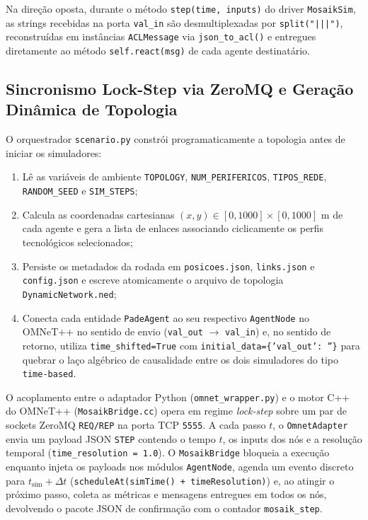 \documentclass[10pt,twocolumn,a4paper]{article}
\begin{document}
Na direção oposta, durante o método \texttt{step(time, inputs)} do driver \texttt{MosaikSim}, as strings recebidas na porta \texttt{val\_in} são desmultiplexadas por \texttt{split("|||")}, reconstruídas em instâncias \texttt{ACLMessage} via \texttt{json\_to\_acl()} e entregues diretamente ao método \texttt{self.react(msg)} de cada agente destinatário.

\subsection{Sincronismo Lock-Step via ZeroMQ e Geração Dinâmica de Topologia}

O orquestrador \texttt{scenario.py} constrói programaticamente a topologia antes de iniciar os simuladores:
\begin{enumerate}
    \item Lê as variáveis de ambiente \texttt{TOPOLOGY}, \texttt{NUM\_PERIFERICOS}, \texttt{TIPOS\_REDE}, \texttt{RANDOM\_SEED} e \texttt{SIM\_STEPS};
    \item Calcula as coordenadas cartesianas $(x, y) \in [0, 1000]\times[0, 1000]\text{ m}$ de cada agente e gera a lista de enlaces associando ciclicamente os perfis tecnológicos selecionados;
    \item Persiste os metadados da rodada em \texttt{posicoes.json}, \texttt{links.json} e \texttt{config.json} e escreve atomicamente o arquivo de topologia \texttt{DynamicNetwork.ned};
    \item Conecta cada entidade \texttt{PadeAgent} ao seu respectivo \texttt{AgentNode} no OMNeT++ no sentido de envio (\texttt{val\_out} $\to$ \texttt{val\_in}) e, no sentido de retorno, utiliza \texttt{time\_shifted=True} com \texttt{initial\_data=\{'val\_out': ''\}} para quebrar o laço algébrico de causalidade entre os dois simuladores do tipo \texttt{time-based}.
\end{enumerate}

O acoplamento entre o adaptador Python (\texttt{omnet\_wrapper.py}) e o motor C++ do OMNeT++ (\texttt{MosaikBridge.cc}) opera em regime \textit{lock-step} sobre um par de sockets ZeroMQ \texttt{REQ/REP} na porta TCP \texttt{5555}. A cada passo $t$, o \texttt{OmnetAdapter} envia um payload JSON \texttt{STEP} contendo o tempo $t$, os inputs dos nós e a resolução temporal (\texttt{time\_resolution = 1.0}). O \texttt{MosaikBridge} bloqueia a execução enquanto injeta os payloads nos módulos \texttt{AgentNode}, agenda um evento discreto para $t_{\text{sim}} + \Delta t$ (\texttt{scheduleAt(simTime() + timeResolution)}) e, ao atingir o próximo passo, coleta as métricas e mensagens entregues em todos os nós, devolvendo o pacote JSON de confirmação com o contador \texttt{mosaik\_step}.
\end{document}
